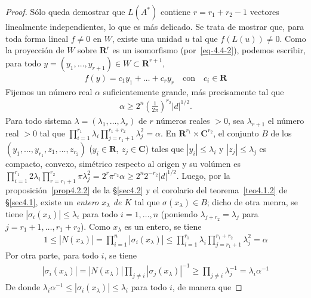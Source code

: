 \documentclass[oneside,bibtotoc,leqno,spanish]{amsbook}
\newcommand{\RR}{\mathbf{R}}
\newcommand{\CC}{\mathbf{C}}
\newcommand{\abs}[1]{\left\lvert#1\right\rvert}
\numberwithin{equation}{section}
\theoremstyle{defi}
\theoremstyle{note}
\theoremstyle{rem}
\numberwithin{theorem}{section}
\numberwithin{proposition}{section}
\numberwithin{definition}{section}
\numberwithin{lemma}{section}
\numberwithin{corollary}{section}
\numberwithin{example}{section}
\numberwithin{footnote}{section}%
\begin{document}
\begin{proof}
S\'olo queda demostrar que $L(A^{*})$ contiene $r = r_{1}+r_{2}-1$ vectores linealmente independientes,
lo que es m\'as delicado. Se trata de mostrar que, para toda forma lineal $f\neq 0$ en $W$, existe una unidad
$u$ tal que $f(L(u))\neq 0$. Como la proyecci\'on de $W$ sobre $\RR^{r}$ es un isomorfismo
(por~\eqref{eq-4.4-2}), podemos escribir, para todo $y=(y_{1},\dots,y_{r+1})\in W\subset\RR^{r+1}$,
\begin{gather}\label{eq-4.4-3}
f(y) = c_{1}y_{1}+\dots+c_{r}y_{r}\quad\text{con}\quad c_{i}\in\RR
\end{gather}
Fijemos un n\'umero real $\alpha$ suficientemente grande, m\'as precisamente tal que
\begin{gather*}
\alpha\geq 2^{n}\left(\frac{1}{2\pi}\right)^{r_{2}}\abs{d}^{1/2}.
\end{gather*}
Para todo sistema $\lambda = (\lambda_{1},\dots,\lambda_{r})$ de $r$ n\'umeros reales $>0$, sea
$\lambda_{r+1}$ el n\'umero real $>0$ tal que $\prod_{i=1}^{r_{1}}\lambda_{i}\prod_{j=r_{1}+1}^{r_{1}+r_{2}}\lambda_{j}^{2}=\alpha$.
En $\RR^{r_{1}}\times\CC^{r_{2}}$, el conjunto $B$ de los $(y_{1},\dots,y_{r_{1}},z_{1},\dots,z_{r_{2}})$
($y_{i}\in\RR$, $z_{j}\in\CC$) tales que $\abs{y_{i}}\leq\lambda_{i}$ y $\abs{z_{j}}\leq\lambda_{j}$
es compacto, convexo, sim\'etrico respecto al origen y su vol\'umen es $\prod_{i=1}^{r_{1}}2\lambda_{i}
\prod_{r=r_{1}+1}^{r_{2}}\pi\lambda_{j}^{2}=2^{r}\pi^{r_{2}}\alpha\geq 2^{n}2^{-r_{2}}\abs{d}^{1/2}$.
Luego, por la proposici\'on~\ref{prop4.2.2} de la \S\ref{sec4.2} y
el corolario del teorema~\ref{teo4.1.2} de \S\ref{sec4.1}, existe un {\em entero $x_{\lambda}$
de $K$} tal que $\sigma(x_{\lambda})\in B$; dicho de otra menra, se tiene $\abs{\sigma_{i}(x_{\lambda})}
\leq\lambda_{i}$ para todo $i=1,\dots,n$ (poniendo $\lambda_{j+r_{2}}=\lambda_{j}$ para $j=r_{1}+1,\dots,r_{1}+r_{2}$).
Como $x_{\lambda}$ es un entero, se tiene
\begin{gather*}
1\leq\abs{N(x_{\lambda})}=\prod_{i=1}^{n}\abs{\sigma_{i}(x_{\lambda})}\leq\prod_{i=1}^{r_{1}}\lambda_{i}
\prod_{j=r_{1}+1}^{r_{1}+r_{2}}\lambda_{j}^{2}=\alpha
\end{gather*}
Por otra parte, para todo $i$, se tiene
\begin{gather*}
\abs{\sigma_{i}(x_{\lambda})}=\abs{N(x_{\lambda})}\prod_{j\neq i}\abs{\sigma_{j}(x_{\lambda})}^{-1}
\geq\prod_{j\neq i}\lambda_{j}^{-1}=\lambda_{i}\alpha^{-1}
\end{gather*}
De donde $\lambda_{i}\alpha^{-1}\leq\abs{\sigma_{i}(x_{\lambda})}\leq\lambda_{i}$ para todo $i$, de manera que

\end{proof}
\end{document}
